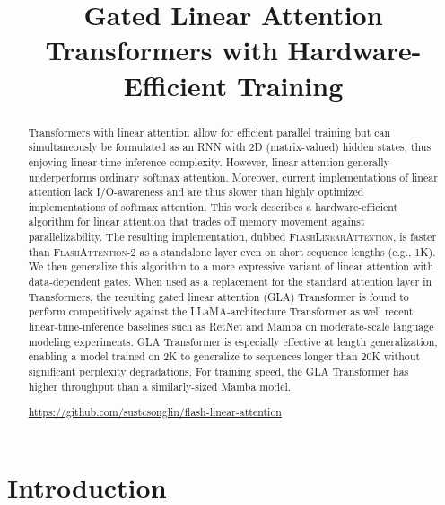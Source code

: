 \title{Gated Linear Attention Transformers with Hardware-Efficient Training}

\begin{abstract}
Transformers with linear attention allow for efficient parallel training  but can simultaneously  be formulated as an RNN with 2D (matrix-valued) hidden states, thus enjoying  linear-time inference complexity. However, linear attention generally underperforms ordinary softmax attention. Moreover, current implementations of linear attention  lack I/O-awareness and are thus slower than highly optimized implementations of softmax attention. This work  describes a hardware-efficient algorithm for linear attention that trades off memory movement against parallelizability. The resulting implementation, dubbed \textsc{FlashLinearAttention}, is faster than \textsc{FlashAttention-2} \cite{flashattention2} as a standalone layer even on short sequence lengths (e.g., 1K). We then generalize this algorithm to a more expressive variant of linear attention with data-dependent gates. When used as a replacement for the standard attention layer in Transformers, the resulting gated linear attention (GLA) Transformer is found to perform  competitively against the LLaMA-architecture Transformer \citep{touvron2023llama} as well recent linear-time-inference baselines such as RetNet \citep{sun2023retentive} and Mamba \citep{Gu2023MambaLS} on moderate-scale language modeling experiments.  GLA Transformer is especially effective at length generalization, enabling a model trained on 2K  to generalize to sequences longer than 20K without significant perplexity degradations. For training speed, the GLA Transformer has higher throughput than a similarly-sized Mamba model.

\begin{minipage}{\linewidth}

   \faGithub \quad  \url{https://github.com/sustcsonglin/flash-linear-attention}

\end{minipage}
\end{abstract}

\section{Introduction}

